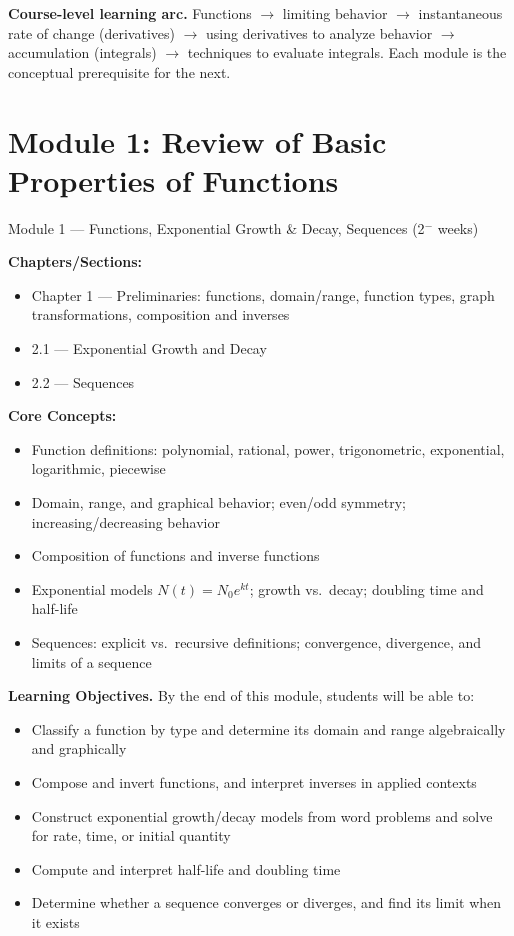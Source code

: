 \documentclass[11pt]{article}
\newcommand{\loheader}{\textbf{Learning Objectives.} By the end of this module, students will be able to:}
\begin{document}
\noindent\textbf{Course-level learning arc.} Functions $\rightarrow$ limiting behavior
$\rightarrow$ instantaneous rate of change (derivatives) $\rightarrow$ using derivatives
to analyze behavior $\rightarrow$ accumulation (integrals) $\rightarrow$ techniques to
evaluate integrals. Each module is the conceptual prerequisite for the next.

\section{Module 1: Review of Basic Properties of Functions}
\label{mod:1}
\begin{modulebox}{Module 1 --- Functions, Exponential Growth \& Decay, Sequences \hfill (2$^-$ weeks)}

\textbf{Chapters/Sections:}
\begin{itemize}[nosep]
  \item Chapter 1 --- Preliminaries: functions, domain/range, function types, graph transformations, composition and inverses
  \item 2.1 --- Exponential Growth and Decay
  \item 2.2 --- Sequences
\end{itemize}

\textbf{Core Concepts:}
\begin{itemize}[nosep]
  \item Function definitions: polynomial, rational, power, trigonometric, exponential, logarithmic, piecewise
  \item Domain, range, and graphical behavior; even/odd symmetry; increasing/decreasing behavior
  \item Composition of functions and inverse functions
  \item Exponential models $N(t) = N_0 e^{kt}$; growth vs.\ decay; doubling time and half-life
  \item Sequences: explicit vs.\ recursive definitions; convergence, divergence, and limits of a sequence
\end{itemize}

\loheader
\begin{itemize}[nosep]
  \item Classify a function by type and determine its domain and range algebraically and graphically
  \item Compose and invert functions, and interpret inverses in applied contexts
  \item Construct exponential growth/decay models from word problems and solve for rate, time, or initial quantity
  \item Compute and interpret half-life and doubling time
  \item Determine whether a sequence converges or diverges, and find its limit when it exists
\end{itemize}
\end{modulebox}
\end{document}
